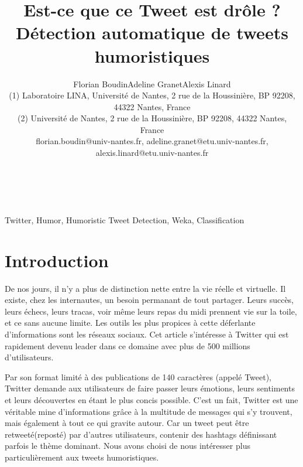 \documentclass[10pt,a4paper,twoside]{article}
\title{Est-ce que ce Tweet est drôle ? Détection automatique de tweets humoristiques}
\author{Florian Boudin\up{1}\quad Adeline Granet\up{2}\quad Alexis Linard\up{2}\\
  (1) Laboratoire LINA, Université de Nantes, 2 rue de la Houssinière, BP 92208, 44322 Nantes, France \\ 
  (2) Université de Nantes, 2 rue de la Houssinière, BP 92208, 44322 Nantes, France\\ 
  florian.boudin@univ-nantes.fr, adeline.granet@etu.univ-nantes.fr, alexis.linard@etu.univ-nantes.fr \\ 
}
\begin{document}
\maketitle


\\

\\

{Twitter, Humor, Humoristic Tweet Detection, Weka, Classification}


\section{Introduction}


De nos jours, il n’y a plus de distinction nette entre la vie réelle et virtuelle. Il existe, chez les internautes, un besoin permanant de tout partager. Leurs succès, leurs échecs, leurs tracas, voir même leurs repas du midi prennent vie sur la toile, et ce sans aucune limite. Les outils les plus propices à cette déferlante d’informations sont les réseaux sociaux. Cet article s'intéresse à Twitter qui est rapidement devenu leader dans ce domaine avec plus de 500 millions d’utilisateurs.

Par son format limité à des publications de 140 caractères (appelé Tweet), Twitter demande aux utilisateurs de faire passer leurs émotions, leurs sentiments et leurs découvertes en étant le plus concis possible. C’est un fait, Twitter est une véritable mine d’informations grâce à la multitude de messages qui s'y trouvent, mais également à tout ce qui gravite autour. Car un tweet peut être retweeté(reposté) par d'autres utilisateurs, contenir des hashtags définissant parfois le thème dominant.  Nous avons choisi de nous intéresser plus particulièrement aux tweets humoristiques.
\end{document}
